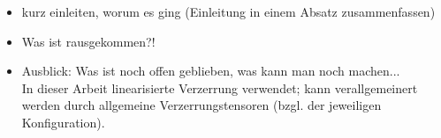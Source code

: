 
\begin{itemize}
\item kurz einleiten, worum es ging (Einleitung in einem Absatz zusammenfassen) 
\item Was ist rausgekommen?!
\item Ausblick: Was ist noch offen geblieben, was kann man noch machen... \\
In dieser Arbeit linearisierte Verzerrung verwendet; kann verallgemeinert werden durch allgemeine Verzerrungstensoren (bzgl. der jeweiligen Konfiguration).
\end{itemize}

\newpage

